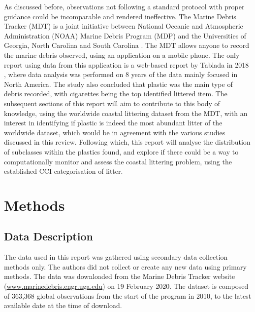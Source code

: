 \documentclass[10pt]{article}\usepackage[]{graphicx}\usepackage[]{color}
\begin{document}
As discussed before, observations not following a standard protocol with proper guidance could be incomparable and rendered ineffective. The Marine Debris Tracker (MDT) is a joint initiative between National Oceanic and Atmospheric Administration (NOAA) Marine Debris Program (MDP) and the Universities of Georgia, North Carolina and South Carolina \cite{JAMBECK2015B}. The MDT allows anyone to record the marine debris observed, using an application on a mobile phone. The only report using data from this application is a web-based report by Tablada in 2018 \cite{JAMBECK2015B}, where data analysis was performed on 8 years of the data mainly focused in North America. The study also concluded that plastic was the main type of debris recorded, with cigarettes being the top identified littered item. The subsequent sections of this report will aim to contribute to this body of knowledge, using the worldwide coastal littering dataset from the MDT, with an interest in identifying if plastic is indeed the most abundant litter of the worldwide dataset, which would be in agreement with the various studies discussed in this review. Following which, this report will analyse the distribution of subclasses within the plastics found, and explore if there could be a way to computationally monitor and assess the coastal littering problem, using the established CCI categorisation of litter. \\








\pagebreak
\section {Methods}\label{methods}

\subsection{Data Description}\label{dataset}

The data used in this report was gathered using secondary data collection methods only. The authors did not collect or create any new data using primary methods. The data was downloaded from the Marine Debris Tracker website (\url{www.marinedebris.engr.uga.edu}) on 19 February 2020. The dataset is composed of 363,368 global observations from the start of the program in 2010, to the latest available date at the time of download. \\
\end{document}
